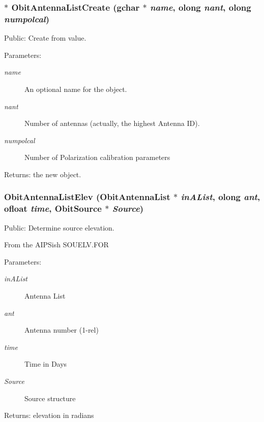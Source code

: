 \subsubsection{$\ast$ Obit\-Antenna\-List\-Create (gchar $\ast$ {\em name}, {\bf olong} {\em nant}, {\bf olong} {\em numpolcal})}\label{ObitAntennaList_8c_a8}


Public: Create from value. 

\begin{Desc}
\item[Parameters:]
\begin{description}
\item[{\em name}]An optional name for the object. \item[{\em nant}]Number of antennas (actually, the highest Antenna ID). \item[{\em numpolcal}]Number of Polarization calibration parameters \end{description}
\end{Desc}
\begin{Desc}
\item[Returns:]the new object. \end{Desc}
\subsubsection{ Obit\-Antenna\-List\-Elev ({\bf Obit\-Antenna\-List} $\ast$ {\em in\-AList}, {\bf olong} {\em ant}, {\bf ofloat} {\em time}, {\bf Obit\-Source} $\ast$ {\em Source})}\label{ObitAntennaList_8c_a11}


Public: Determine source elevation. 

From the AIPSish SOUELV.FOR \begin{Desc}
\item[Parameters:]
\begin{description}
\item[{\em in\-AList}]Antenna List \item[{\em ant}]Antenna number (1-rel) \item[{\em time}]Time in Days \item[{\em Source}]Source structure \end{description}
\end{Desc}
\begin{Desc}
\item[Returns:]elevation in radians \end{Desc}
